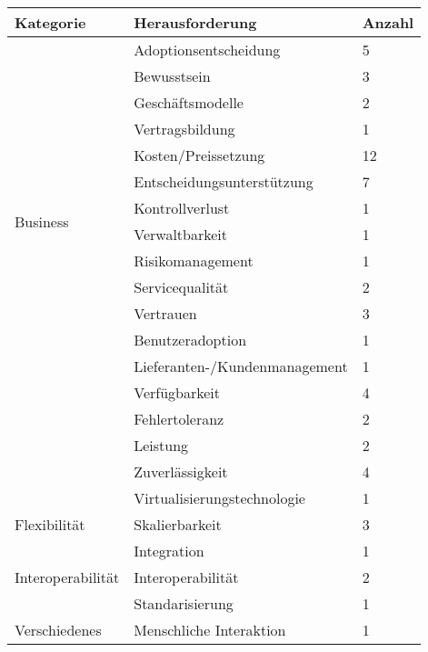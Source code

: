 \begin{table}
    \centering
    \begin{tabular}{|l|l|l|}
        \hline
        \textbf{Kategorie} & \textbf{Herausforderung} & \textbf{Anzahl} \\
        \hline
        \multirow{14}{*}{Business} & Adoptionsentscheidung & 5 \\ 
        \cline{2-3}
         & Bewusstsein & 3 \\ 
        \cline{2-3}
        & Geschäftsmodelle & 2 \\ 
        \cline{2-3}
        & Vertragsbildung & 1 \\ 
        \cline{2-3}
        & Kosten/Preissetzung & 12 \\ 
        \cline{2-3}
        & Entscheidungsunterstützung & 7 \\ 
        \cline{2-3}
        & Kontrollverlust & 1 \\ 
        \cline{2-3}
        & Verwaltbarkeit & 1 \\ 
        \cline{2-3}
        & Risikomanagement & 1 \\ 
        \cline{2-3}
        & Servicequalität & 2 \\ 
        \cline{2-3}
        & Vertrauen & 3 \\ 
        \cline{2-3}
        & Benutzeradoption & 1 \\ 
        \cline{2-3}
        & Lieferanten-/Kundenmanagement & 1 \\ 
        \hline
        \multirow{5}{*}{Zuverlässigkeit} & Verfügbarkeit & 4 \\ 
        \cline{2-3}
        & Fehlertoleranz & 2 \\ 
        \cline{2-3}
        & Leistung & 2 \\ 
        \cline{2-3}
        & Zuverlässigkeit & 4 \\ 
        \cline{2-3}
        & Virtualisierungstechnologie & 1 \\ 
        \hline
        Flexibilität & Skalierbarkeit & 3 \\ 
        \hline
        \multirow{3}{*}{Interoperabilität} & Integration & 1 \\ 
        \cline{2-3}
        & Interoperabilität & 2 \\ 
        \cline{2-3}
        & Standarisierung & 1 \\ 
        \hline
        \multirow{2}{*}{Verschiedenes} & Menschliche Interaktion & 1 \\ 
        \cline{2-3}

\end{tabular}
\end{table}
